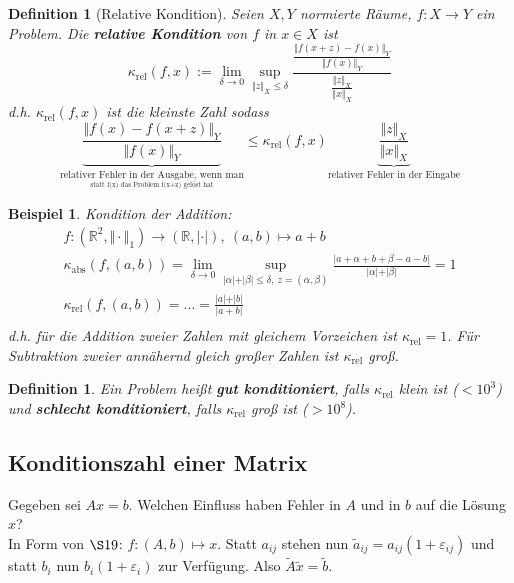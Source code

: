 \documentclass[12pt]{article}
\theoremstyle{break}
\newtheorem{definition}[theorem]{Definition}
\newtheorem{example}[theorem]{Beispiel}
\begin{document}
\begin{definition}[Relative Kondition]
Seien $X, Y$ normierte Räume, $f: X \rightarrow Y$ ein Problem. Die \textbf{relative Kondition} von $f$ in $x \in X$ ist
$$\kappa_{\text{rel}}(f,x) := \lim_{\delta \rightarrow 0} \sup_{\Vert z \Vert_X \leq \delta} \frac{\frac{\Vert f(x+z) - f(x) \Vert_Y}{\Vert f(x) \Vert_Y}}{\frac{\Vert z \Vert_X}{\Vert x \Vert_X}} $$
d.h. $\kappa_{\text{rel}}(f,x)$ ist die kleinste Zahl sodass 
$$\underbrace{\frac{\Vert f(x) - f(x+z) \Vert_Y}{\Vert f(x) \Vert_Y}}_{\underset{\text{statt f(x) das Problem f(x+z) gelöst hat}}{\text{relativer Fehler in der Ausgabe, wenn man}}} \leq \kappa_{\text{rel}}(f,x) \underbrace{\frac{\Vert z \Vert_X}{\Vert x \Vert_X}}_{\text{relativer Fehler in der Eingabe}}$$
\end{definition}

\begin{example}
Kondition der Addition:
\begin{align*}
&f: (\mathbb{R}^2, \Vert \cdot \Vert_1) \rightarrow (\mathbb{R}, \vert \cdot \vert), \medspace (a, b) \mapsto a+b &\\
&\kappa_{\text{abs}}(f,(a,b)) = \lim_{\delta \rightarrow 0} \sup_{\vert \alpha \vert + \vert \beta \vert \leq \delta, \medspace z = (\alpha, \beta)} \frac{\vert a + \alpha + b + \beta - a - b \vert}{\vert \alpha \vert + \vert \beta \vert} = 1 &\\
&\kappa_{\text{rel}}(f,(a,b)) = ... = \frac{\vert a \vert + \vert b \vert}{\vert a+b \vert} &\\
\end{align*}
d.h. für die Addition zweier Zahlen mit gleichem Vorzeichen ist $\kappa_{\text{rel}} = 1$. Für Subtraktion zweier annähernd gleich großer Zahlen ist $\kappa_{\text{rel}}$ groß.
\end{example}

\begin{definition}
Ein Problem heißt \textbf{gut konditioniert}, falls $\kappa_{\text{rel}}$ klein ist ($< 10^3$) und \textbf{schlecht konditioniert}, falls $\kappa_{\text{rel}}$ groß ist ($>10^8$).
\end{definition}

\subsection{Konditionszahl einer Matrix}
Gegeben sei $Ax = b$. Welchen Einfluss haben Fehler in $A$ und in $b$ auf die Lösung $x$?\\
In Form von $\S 19$: $f: (A, b) \mapsto x$. Statt $a_{ij}$ stehen nun $\tilde{a}_{ij}= a_{ij}(1+ \varepsilon_{ij})$ und statt $b_i$ nun $b_i(1+ \varepsilon_{i})$ zur Verfügung. Also $\tilde{A} \tilde{x} = \tilde{b}$. 
\end{document}

